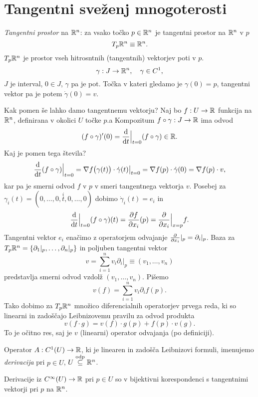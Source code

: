 \chapter{Tangentni sve\v zenj mnogoterosti}

\begin{defin}
	\emph{Tangentni prostor} na $\mathbb{R}^n$: za vsako to\v cko $p \in \mathbb{R}^n$ je tangentni prostor na $\mathbb{R}^n$ v $p$
	\[
		T_p \mathbb{R}^n \equiv \mathbb{R}^n.
	\]
	$T_p\mathbb{R}^n$ je prostor vseh hitrosntnih (tangentnih) vektorjev poti v $p$.
	\[
		\gamma : J \to \mathbb{R}^n, \quad \gamma \in C^1,
	\]
	$J$ je interval, $0 \in J$, $\gamma$ pa je pot.
	To\v cka v kateri gledamo je $\gamma (0) = p$, tangentni vektor pa je potem $\dot{\gamma}(0) = v$.
\end{defin}

Kak pomen \v se lahko damo tangentnemu vektorju? Naj bo $f : U \to \mathbb{R}$ funkcija na $\mathbb{R}^n$, definirana v okolici $U$
to\v cke $p$.a Kompozitum $f \circ \gamma : J \to \mathbb{R}$ ima odvod
\[
	(f \circ \gamma)' (0) = \frac{\text{d}}{\text{d} t}\Big|_{t = 0} (f \circ \gamma) \in \mathbb{R}.
\]
Kaj je pomen tega \v stevila?
\[
	\frac{\text{d}}{\text{d} t}(f \circ \gamma)\Big|_{t = 0} = \nabla f\big(\gamma(t)\big) \cdot \dot{\gamma}(t)\big|_{t = 0}
		= \nabla f(p) \cdot \dot{\gamma}(0) = \nabla f(p) \cdot v,
\]
kar pa je smerni odvod $f$ v $p$ v smeri tangentnega vektorja $v$. Posebej za $\gamma_i (t) = (0, \ldots, 0, 
\stackrel{i}{t},
0, \ldots, 0)$ dobimo $\dot{\gamma}_i(t) = e_i$ in
\[
	\frac{\text{d}}{\text{d} t}\Big|_{t = 0} (f \circ \gamma) (t) = \frac{\partial f}{\partial x_i}(p) = \frac{\partial }{\partial x_i}\Big|_{x = p} f.
\]
Tangentni vektor $e_i$ ena\v cimo z operatorjem odvajanje $\frac{\partial }{\partial x_i}|_p = \partial_i |_p$. Baza za
$T_p \mathbb{R}^n = \{\partial_1|_p, \ldots, \partial_n|_p\}$ in poljuben tangentni vektor
\[
	v = \sum_{i = 1}^n v_i \partial_i |_p \equiv (v_1, \ldots, v_n)
\]
predstavlja smerni odvod vzdol\v z $(v_1, \ldots, v_n)$. Pi\v semo
\[
	v (f) = \sum_{i = 1}^n v_i \partial_i f(p).
\]
Tako dobimo za $T_p \mathbb{R}^n$ mno\v zico diferencialnih operatorjev prvega reda, ki so linearni in zado\v s\v cajo
Leibnizovemu pravilu za odvod produkta
\[
	v(f\cdot g) = v(f) \cdot g(p) + f(p) \cdot v(g).
\]
To je o\v citno res, saj je $v$ (linearni) operator odvajanja (po definiciji).

\begin{defin}
	Operator $A : C^1 (U) \to \mathbb{R}$, ki je linearen in zado\v s\v ca Leibnizovi formuli, imenujemo \emph{derivacija} pri $p \in U$,
	$U \stackrel{\text{odp}}{\subseteq} \mathbb{R}^n$.
\end{defin}

\begin{trditev}
	Derivacije iz $C^\infty (U) \to \mathbb{R}$ pri $p \in U$ so v bijektivni korespondenci s tangentnimi vektorji pri $p$ na $\mathbb{R}^n$.
\end{trditev}

